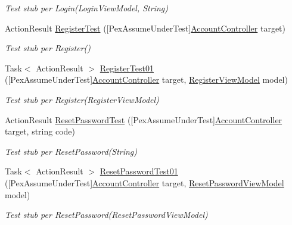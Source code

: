 \begin{DoxyCompactItemize}
\begin{DoxyCompactList}\small\item\em Test stub per Login(\+Login\+View\+Model, String)\end{DoxyCompactList}\item 
Action\+Result \mbox{\hyperlink{class_brew_day2_1_1_tests_1_1_account_controller_test_a7760e5a69e40b3c62b41639a8843e188}{Register\+Test}} (\mbox{[}Pex\+Assume\+Under\+Test\mbox{]}\mbox{\hyperlink{class_brew_day2_1_1_controllers_1_1_account_controller}{Account\+Controller}} target)
\begin{DoxyCompactList}\small\item\em Test stub per Register()\end{DoxyCompactList}\item 
Task$<$ Action\+Result $>$ \mbox{\hyperlink{class_brew_day2_1_1_tests_1_1_account_controller_test_a1ee78b130805938d98a973e076803a55}{Register\+Test01}} (\mbox{[}Pex\+Assume\+Under\+Test\mbox{]}\mbox{\hyperlink{class_brew_day2_1_1_controllers_1_1_account_controller}{Account\+Controller}} target, \mbox{\hyperlink{class_brew_day2_1_1_models_1_1_register_view_model}{Register\+View\+Model}} model)
\begin{DoxyCompactList}\small\item\em Test stub per Register(\+Register\+View\+Model)\end{DoxyCompactList}\item 
Action\+Result \mbox{\hyperlink{class_brew_day2_1_1_tests_1_1_account_controller_test_ad35283ffbf30e2f60fbe2a97a3fbb578}{Reset\+Password\+Test}} (\mbox{[}Pex\+Assume\+Under\+Test\mbox{]}\mbox{\hyperlink{class_brew_day2_1_1_controllers_1_1_account_controller}{Account\+Controller}} target, string code)
\begin{DoxyCompactList}\small\item\em Test stub per Reset\+Password(\+String)\end{DoxyCompactList}\item 
Task$<$ Action\+Result $>$ \mbox{\hyperlink{class_brew_day2_1_1_tests_1_1_account_controller_test_a512bedc2f892f896b7f00900bb9741e3}{Reset\+Password\+Test01}} (\mbox{[}Pex\+Assume\+Under\+Test\mbox{]}\mbox{\hyperlink{class_brew_day2_1_1_controllers_1_1_account_controller}{Account\+Controller}} target, \mbox{\hyperlink{class_brew_day2_1_1_models_1_1_reset_password_view_model}{Reset\+Password\+View\+Model}} model)
\begin{DoxyCompactList}\small\item\em Test stub per Reset\+Password(\+Reset\+Password\+View\+Model)\end{DoxyCompactList}\item 

\end{DoxyCompactItemize}
